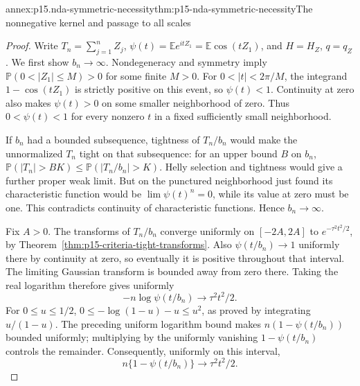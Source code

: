 \begin{annexitem}{annex:p15.nda-symmetric-necessity}{thm:p15-nda-symmetric-necessity}{The nonnegative kernel and passage to all scales}
\begin{proof}
Write \(T_n=\sum_{j=1}^nZ_j\),
\(\psi(t)=\mathbb Ee^{itZ_1}=\mathbb E\cos(tZ_1)\),
and \(H=H_Z\), \(q=q_Z\).
We first show \(b_n\to\infty\).
Nondegeneracy and symmetry imply
\(\mathbb P(0<|Z_1|\leq M)>0\) for some finite \(M>0\).
For \(0<|t|<2\pi/M\), the integrand \(1-\cos(tZ_1)\)
is strictly positive on this event, so \(\psi(t)<1\).
Continuity at zero also makes \(\psi(t)>0\) on some smaller
neighborhood of zero. Thus \(0<\psi(t)<1\) for every nonzero
\(t\) in a fixed sufficiently small neighborhood.

If \(b_n\) had a bounded subsequence, tightness of \(T_n/b_n\)
would make the unnormalized \(T_n\) tight on that subsequence:
for an upper bound \(B\) on \(b_n\),
\(\mathbb P(|T_n|>BK)\leq\mathbb P(|T_n/b_n|>K)\).
Helly selection and tightness would give a further proper weak
limit. But on the punctured neighborhood just found its
characteristic function would be
\(\lim\psi(t)^n=0\), while its value at zero must be one.
This contradicts continuity of characteristic functions.
Hence \(b_n\to\infty\).

Fix \(A>0\). The transforms of \(T_n/b_n\) converge uniformly
on \([-2A,2A]\) to \(e^{-\tau^2t^2/2}\), by
Theorem~\ref{thm:p15-criteria-tight-transforms}.
Also \(\psi(t/b_n)\to1\) uniformly there by continuity at zero,
so eventually it is positive throughout that interval.
The limiting Gaussian transform is bounded away from zero there.
Taking the real logarithm therefore gives uniformly
\[
 -n\log\psi(t/b_n)\longrightarrow\tau^2t^2/2.
 \]
For \(0\leq u\leq1/2\),
\(0\leq-\log(1-u)-u\leq u^2\), as proved by integrating
\(u/(1-u)\). The preceding uniform logarithm bound makes
\(n(1-\psi(t/b_n))\) bounded uniformly; multiplying by the
uniformly vanishing \(1-\psi(t/b_n)\) controls the remainder.
Consequently, uniformly on this interval,
\[
 n\{1-\psi(t/b_n)\}\longrightarrow\tau^2t^2/2.             \tag{1}
 \]


\end{proof}
\end{annexitem}
